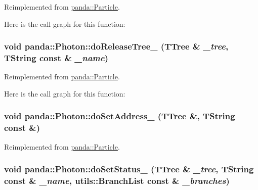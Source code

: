 Reimplemented from \hyperlink{classpanda_1_1Particle_a3c8e5de4513c492b0bad74e5ba551775}{panda::Particle}.

Here is the call graph for this function:\hypertarget{classpanda_1_1Photon_a316d874232548d46d8ce0452b1d0fda9}{
\subsubsection[{doReleaseTree\_\-}]{\setlength{\rightskip}{0pt plus 5cm}void panda::Photon::doReleaseTree\_\- (TTree \& {\em \_\-tree}, \/  TString const \& {\em \_\-name})}}
\label{classpanda_1_1Photon_a316d874232548d46d8ce0452b1d0fda9}


Reimplemented from \hyperlink{classpanda_1_1Particle_aff400fb217d44df886826a4ac1f4ca9b}{panda::Particle}.

Here is the call graph for this function:\hypertarget{classpanda_1_1Photon_a9a8788ec145f035a7a2875d5a7f9ef98}{
\subsubsection[{doSetAddress\_\-}]{\setlength{\rightskip}{0pt plus 5cm}void panda::Photon::doSetAddress\_\- (TTree \&, \/  TString const \&)}}
\label{classpanda_1_1Photon_a9a8788ec145f035a7a2875d5a7f9ef98}


Reimplemented from \hyperlink{classpanda_1_1Particle_a96e604e87ef1bc5931b4cd3da447b084}{panda::Particle}.\hypertarget{classpanda_1_1Photon_a8fbe4f60488cc95024bd4a50b6df6b95}{
\subsubsection[{doSetStatus\_\-}]{\setlength{\rightskip}{0pt plus 5cm}void panda::Photon::doSetStatus\_\- (TTree \& {\em \_\-tree}, \/  TString const \& {\em \_\-name}, \/  {\bf utils::BranchList} const \& {\em \_\-branches})}}
\label{classpanda_1_1Photon_a8fbe4f60488cc95024bd4a50b6df6b95}


